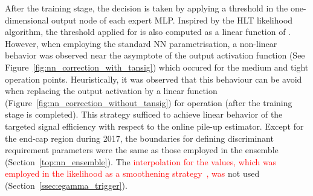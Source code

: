 After the training stage, the decision is taken by applying a threshold in the
one-dimensional output node of each expert MLP.\@ 
Inspired by the HLT likelihood algorithm, the threshold applied for
\rnn is also computed as a linear function of \avgmu{}.
However, when employing the standard NN parametrisation, a non-linear
behavior was observed near the asymptote of the output activation 
function (See Figure~\ref{fig:nn_correction_with_tansig}) which occured
for the medium and tight operation points. Heuristically, it was 
observed that this behaviour can be avoid when replacing the output
activation by a linear function (Figure~\ref{fig:nn_correction_without_tansig})
for operation (after the training stage is completed).
This strategy sufficed to achieve linear
behavior of the targeted signal efficiency with respect to the online pile-up
estimator. Except for the end-cap region during 2017, the boundaries for
defining discriminant requirement parameters were the same as those employed in
the \rnn ensemble (Section~\ref{top:nn_ensemble}). The 
\textcolor{red}{interpolation for the \et{} values, which was employed in the likelihood as a smoothening strategy~\cite{aaboud2019electron}, was}
not used (Section~\ref{ssec:egamma_trigger}).



